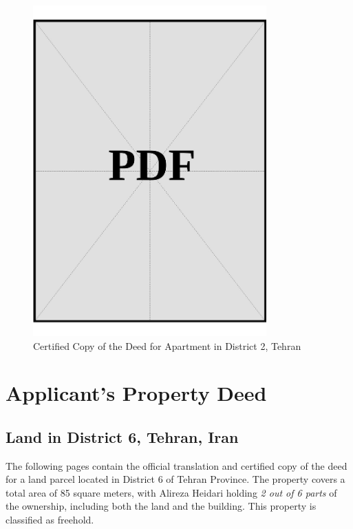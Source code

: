 \vspace*{\fill}
\begin{figure}[h]
    \centering
    \includegraphics[page=1, width=0.8\textwidth]{../application-docs/sponsor/funds/property-deeds/property-2/certified-copies.pdf}
    \caption{Certified Copy of the Deed for Apartment in District 2, Tehran}
    \label{fig:sponsor-apartment-dist2-tehran-certified-copy}
\end{figure}
\vspace*{\fill}

\clearpage

\section{Applicant's Property Deed}

\subsection{Land in District 6, Tehran, Iran}\label{sec:applicant-land-dist6-tehran}

The following pages contain the official translation and certified copy of the deed for a land parcel located in District 6 of Tehran Province. The property covers a total area of 85 square meters, with Alireza Heidari holding \textit{2 out of 6 parts} of the ownership, including both the land and the building. This property is classified as freehold.


